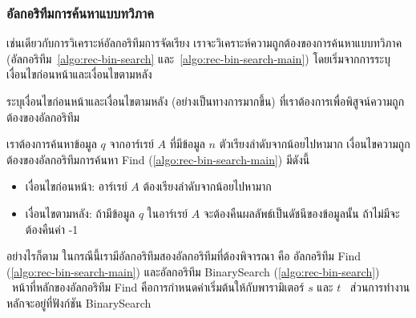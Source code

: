 \subsubsection{อัล{\wbr}กอ{\wbr}ริ{\wbr}ทึม{\wbr}การ{\wbr}ค้นหา{\wbr}แบบ{\wbr}ทวิภาค}

เช่นเดียวกับ{\wbr}การ{\wbr}วิเคราะห์{\wbr}อัล{\wbr}กอ{\wbr}ริ{\wbr}ทึม{\wbr}การ{\wbr}จัดเรียง{\wbr}
เรา{\wbr}จะ{\wbr}วิเคราะห์{\wbr}ความ{\wbr}ถูกต้อง{\wbr}ของ{\wbr}การ{\wbr}ค้นหา{\wbr}แบบ{\wbr}ทวิภาค{\wbr}
(อัล{\wbr}กอ{\wbr}ริ{\wbr}ทึม~\ref{algo:rec-bin-search} และ~\ref{algo:rec-bin-search-main})
โดย{\wbr}เริ่ม{\wbr}จาก{\wbr}การ{\wbr}ระบุ{\wbr}เงื่อนไข{\wbr}ก่อนหน้า{\wbr}และ{\wbr}เงื่อนไข{\wbr}ตาม{\wbr}หลัง{\wbr}

\begin{quiz}{}
ระบุ{\wbr}เงื่อนไข{\wbr}ก่อนหน้า{\wbr}และ{\wbr}เงื่อนไข{\wbr}ตาม{\wbr}หลัง (อย่าง{\wbr}เป็นทางการ{\wbr}มาก{\wbr}ขึ้น)
ที่{\wbr}เรา{\wbr}ต้องการ{\wbr}เพื่อ{\wbr}พิสูจน์{\wbr}ความ{\wbr}ถูกต้อง{\wbr}ของ{\wbr}อัล{\wbr}กอ{\wbr}ริ{\wbr}ทึม{\wbr}
\end{quiz}

เรา{\wbr}ต้องการ{\wbr}ค้นหา{\wbr}ข้อมูล $q$ จาก{\wbr}อาร์เรย์ $A$ ที่{\wbr}มี{\wbr}ข้อมูล $n$ ตัว{\wbr}เรียงลำดับ{\wbr}จาก{\wbr}น้อย{\wbr}ไป{\wbr}หา{\wbr}มาก{\wbr}
เงื่อนไข{\wbr}ความ{\wbr}ถูกต้อง{\wbr}ของ{\wbr}อัล{\wbr}กอ{\wbr}ริ{\wbr}ทึม{\wbr}การ{\wbr}ค้นหา Find (\ref{algo:rec-bin-search-main})
มี{\wbr}ดังนี้{\wbr}
\begin{itemize}
\item เงื่อนไข{\wbr}ก่อนหน้า: อาร์เรย์ $A$ ต้อง{\wbr}เรียงลำดับ{\wbr}จาก{\wbr}น้อย{\wbr}ไป{\wbr}หา{\wbr}มาก{\wbr}
\item เงื่อนไข{\wbr}ตาม{\wbr}หลัง: ถ้า{\wbr}มี{\wbr}ข้อมูล $q$ ใน{\wbr}อาร์เรย์ $A$
  จะ{\wbr}ต้อง{\wbr}คืน{\wbr}ผลลัพธ์{\wbr}เป็น{\wbr}ดัชนี{\wbr}ของ{\wbr}ข้อมูล{\wbr}นั้น ถ้า{\wbr}ไม่{\wbr}มี{\wbr}จะ{\wbr}ต้อง{\wbr}คืน{\wbr}ค่า -1
\end{itemize}

อย่างไรก็ตาม ใน{\wbr}กรณี{\wbr}นี้{\wbr}เรา{\wbr}มี{\wbr}อัล{\wbr}กอ{\wbr}ริ{\wbr}ทึม{\wbr}สอง{\wbr}อัล{\wbr}กอ{\wbr}ริ{\wbr}ทึม{\wbr}ที่{\wbr}ต้อง{\wbr}พิจารณา คือ อัล{\wbr}กอ{\wbr}ริ{\wbr}ทึม Find
(\ref{algo:rec-bin-search-main}) และ{\wbr}อัล{\wbr}กอ{\wbr}ริ{\wbr}ทึม BinarySearch
(\ref{algo:rec-bin-search}) \ หน้าที่{\wbr}หลัก{\wbr}ของ{\wbr}อัล{\wbr}กอ{\wbr}ริ{\wbr}ทึม Find
คือ{\wbr}การ{\wbr}กำหนด{\wbr}ค่า{\wbr}เริ่มต้น{\wbr}ให้{\wbr}กับ{\wbr}พารามิเตอร์ $s$ และ $t$ \ ส่วน{\wbr}การ{\wbr}ทำงาน{\wbr}หลัก{\wbr}จะ{\wbr}อยู่{\wbr}ที่{\wbr}ฟังก์ชัน{\wbr}
BinarySearch


